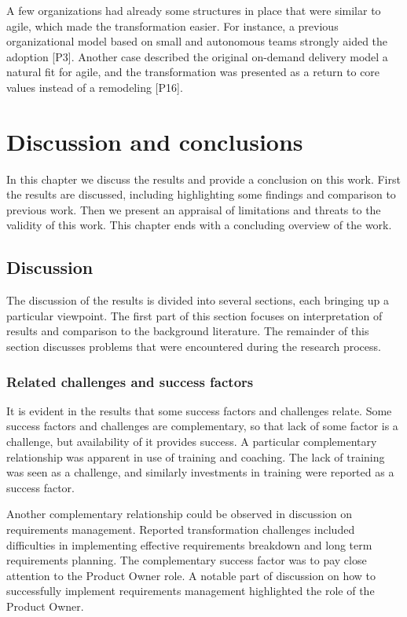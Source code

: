 
A few organizations had already some structures in place that were similar to
agile, which made the transformation easier.
For instance, a previous organizational model based on small and autonomous
teams strongly aided the adoption [P3].
Another case described the original on-demand delivery model a natural fit for
agile, and the transformation was presented as a return to core values instead
of a remodeling [P16].


\clearpage

\chapter{Discussion and conclusions}
\label{sec:discussion}

In this chapter we discuss the results and provide a conclusion on this work.
First the results are discussed, including highlighting some findings and
comparison to previous work. Then we present an appraisal of limitations and
threats to the validity of this work. This chapter ends with a concluding
overview of the work.

\section{Discussion}

The discussion of the results is divided into several sections, each bringing up
a particular viewpoint. The first part of this section focuses on interpretation
of results and comparison to the background literature. The remainder of this
section discusses problems that were encountered during the research process.

\subsection{Related challenges and success factors}

It is evident in the results that some success factors and challenges relate.
Some success factors and challenges are complementary, so that lack of some
factor is a challenge, but availability of it provides success.
A particular complementary relationship was apparent in use of training
and coaching. The lack of training was seen as a challenge, and similarly
investments in training were reported as a success factor.

Another complementary relationship could be observed in discussion on
requirements management. Reported transformation challenges included
difficulties in implementing effective requirements breakdown and long term
requirements planning. The complementary success factor was to pay close
attention to the Product Owner role. A notable part of discussion on how to
successfully implement requirements management highlighted the role of the
Product Owner.

